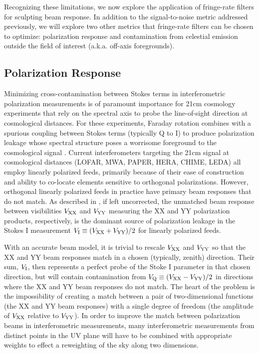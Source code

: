 \documentclass[twocolumn,apj,numberedappendix]{emulateapj}
\begin{document}
Recognizing these limitations, we now explore the application of fringe-rate filters for sculpting beam response.
In addition to the signal-to-noise metric addressed previously, we will explore two other metrics that fringe-rate
filters can be chosen to optimize: polarization response and contamination from celestial emission outside the field of
interest (a.k.a. off-axis foregrounds).

\subsection{Polarization Response}
\label{sec:polbeams}
\def\VXX{{V_{\rm XX}}}
\def\VYY{{V_{\rm YY}}}
\def\VI{{V_{\rm I}}}
\def\VQ{{V_{\rm Q}}}

Minimizing cross-contamination between Stokes terms in interferometric polarization measurements
is of paramount importance for 21cm cosmology experiments that rely on
the spectral axis to probe the line-of-sight direction at cosmological distances.  For these
experiments, Faraday rotation combines
with a spurious coupling between Stokes terms (typically Q to I) to produce polarization leakage whose 
spectral structure poses a worrisome foreground
to the cosmological signal \citep{jelic_et_al2008,bernardi,moore_et_al2013,moore_et_al2015}.  Current interferometers
targeting the 21cm signal at cosmological distances (LOFAR, MWA, PAPER, HERA, CHIME, LEDA) all employ linearly
polarized feeds, primarily because of their ease of construction and ability to co-locate elements sensitive to
orthogonal polarizations.  However, orthogonal linearly polarized feeds in practice have primary beam responses
that do not match.  As described in \citet{moore_et_al2013}, if left uncorrected, the unmatched beam response 
between visibilities $\VXX$ and $\VYY$ measuring the XX and YY polarization products, respectively, is the 
dominant source of polarization leakage in the Stokes I measurement $\VI\equiv(\VXX+\VYY)/2$ for
linearly polarized feeds.

With an accurate beam model, it is trivial to rescale $\VXX$ and $\VYY$ 
so that the XX and YY beam responses match in a chosen (typically, zenith) direction.  Their sum, $\VI$, then
represents a perfect probe of the Stoke I parameter in that chosen direction, but will contain contamination
from $\VQ\equiv(\VXX-\VYY)/2$ in directions where the XX and YY beam responses do not match.
The heart of the problem is the impossibility of creating a match between a pair of two-dimensional functions (the
XX and YY beam responses) with a single degree of freedom (the amplitude of $\VXX$ relative to $\VYY$).  In order
to improve the match between polarization beams in interferometric measurements, many interferometric measurements
from distinct points in the UV plane will have to be combined with appropriate weights to effect a reweighting
of the sky along two dimensions.
\end{document}
